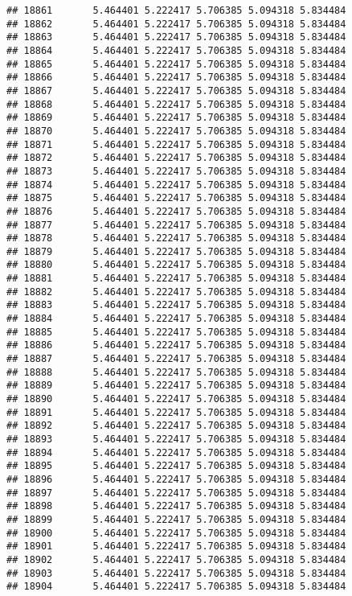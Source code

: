 \documentclass[
]{article}
\begin{document}
\begin{verbatim}
## 18861       5.464401 5.222417 5.706385 5.094318 5.834484
## 18862       5.464401 5.222417 5.706385 5.094318 5.834484
## 18863       5.464401 5.222417 5.706385 5.094318 5.834484
## 18864       5.464401 5.222417 5.706385 5.094318 5.834484
## 18865       5.464401 5.222417 5.706385 5.094318 5.834484
## 18866       5.464401 5.222417 5.706385 5.094318 5.834484
## 18867       5.464401 5.222417 5.706385 5.094318 5.834484
## 18868       5.464401 5.222417 5.706385 5.094318 5.834484
## 18869       5.464401 5.222417 5.706385 5.094318 5.834484
## 18870       5.464401 5.222417 5.706385 5.094318 5.834484
## 18871       5.464401 5.222417 5.706385 5.094318 5.834484
## 18872       5.464401 5.222417 5.706385 5.094318 5.834484
## 18873       5.464401 5.222417 5.706385 5.094318 5.834484
## 18874       5.464401 5.222417 5.706385 5.094318 5.834484
## 18875       5.464401 5.222417 5.706385 5.094318 5.834484
## 18876       5.464401 5.222417 5.706385 5.094318 5.834484
## 18877       5.464401 5.222417 5.706385 5.094318 5.834484
## 18878       5.464401 5.222417 5.706385 5.094318 5.834484
## 18879       5.464401 5.222417 5.706385 5.094318 5.834484
## 18880       5.464401 5.222417 5.706385 5.094318 5.834484
## 18881       5.464401 5.222417 5.706385 5.094318 5.834484
## 18882       5.464401 5.222417 5.706385 5.094318 5.834484
## 18883       5.464401 5.222417 5.706385 5.094318 5.834484
## 18884       5.464401 5.222417 5.706385 5.094318 5.834484
## 18885       5.464401 5.222417 5.706385 5.094318 5.834484
## 18886       5.464401 5.222417 5.706385 5.094318 5.834484
## 18887       5.464401 5.222417 5.706385 5.094318 5.834484
## 18888       5.464401 5.222417 5.706385 5.094318 5.834484
## 18889       5.464401 5.222417 5.706385 5.094318 5.834484
## 18890       5.464401 5.222417 5.706385 5.094318 5.834484
## 18891       5.464401 5.222417 5.706385 5.094318 5.834484
## 18892       5.464401 5.222417 5.706385 5.094318 5.834484
## 18893       5.464401 5.222417 5.706385 5.094318 5.834484
## 18894       5.464401 5.222417 5.706385 5.094318 5.834484
## 18895       5.464401 5.222417 5.706385 5.094318 5.834484
## 18896       5.464401 5.222417 5.706385 5.094318 5.834484
## 18897       5.464401 5.222417 5.706385 5.094318 5.834484
## 18898       5.464401 5.222417 5.706385 5.094318 5.834484
## 18899       5.464401 5.222417 5.706385 5.094318 5.834484
## 18900       5.464401 5.222417 5.706385 5.094318 5.834484
## 18901       5.464401 5.222417 5.706385 5.094318 5.834484
## 18902       5.464401 5.222417 5.706385 5.094318 5.834484
## 18903       5.464401 5.222417 5.706385 5.094318 5.834484
## 18904       5.464401 5.222417 5.706385 5.094318 5.834484

\end{verbatim}
\end{document}
